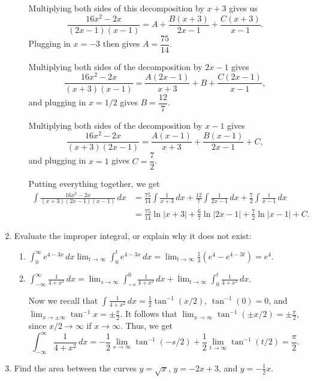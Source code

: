\documentclass[12pt]{article}
\newcommand{\di}{\displaystyle}
\newcommand{\abs}[1]{\lvert #1\rvert}
\begin{document}
\begin{enumerate}
\begin{enumerate}
Multiplying both sides of this decomposition by $x+3$ gives us 
\[
 \dfrac{16x^2-2x}{(2x-1)(x-1)} = A +\dfrac{B(x+3)}{2x-1}+\dfrac{C(x+3)}{x-1}.
\]
 Plugging in $x=-3$ then gives
$A=\dfrac{75}{14}$.

Multiplying both sides of the decomposition by $2x-1$ gives 
\[
 \dfrac{16x^2-2x}{(x+3)(x-1)} = \dfrac{A(2x-1)}{x+3}+B+\dfrac{C(2x-1)}{x-1},
\]
 and plugging in $x=1/2$ gives $B = \dfrac{12}{7}$.

Multiplying both sides of the decomposition by $x-1$ gives 
\[
 \dfrac{16x^2-2x}{(x+3)(2x-1)} = \dfrac{A(x-1)}{x+3}+\dfrac{B(x-1)}{2x-1}+C,
\]
 and plugging in $x=1$ gives $C=\dfrac{7}{2}$.

Putting everything together, we get
\begin{align*}
 \int \frac{16x^2-2x}{(x+3)(2x-1)(x-1)}\,dx &= \frac{75}{14}\int\frac{1}{x+3}\,dx +\frac{12}{7}\int\frac{1}{2x-1}\,dx + \frac{7}{2}\int\frac{1}{x-1}\,dx\\
& = \frac{75}{14}\ln\abs{x+3}+\frac{6}{7}\ln\abs{2x-1}+\frac{7}{2}\ln\abs{x-1}+C.
\end{align*}

\end{enumerate}



  \item Evaluate the improper integral, or explain why it does not exist:
\begin{enumerate}
 \item $\di \int_0^\infty e^{4-3x}\,dx\lim_{t\to \infty}\int_0^t e^{4-3x}\,dx = \lim_{t\to\infty}\frac{1}{3}(e^4-e^{4-3t})=e^4.$
 

 
 \item $\di \int_{-\infty}^\infty \frac{1}{4+x^2}\,dx = \lim_{s\to\infty}\int_{-s}^0\frac{1}{4+x^2}\,dx+\lim_{t\to\infty}\int_0^t\frac{1}{4+x^2}\,dx$.

Now we recall that $\di \int \frac{1}{4+x^2}\,dx = \frac{1}{2}\tan^{-1}(x/2)$, $\tan^{-1}(0)=0$, and $\lim_{x\to\pm\infty}\tan^{-1}x = \pm \frac{\pi}{2}$. It follows that $\lim_{x\to\infty}\tan^{-1}(\pm x/2) = \pm \frac{\pi}{2}$, since $x/2\to \infty$ if $x\to \infty$. Thus, we get
\[
 \int_{-\infty}^\infty \frac{1}{4+x^2}\,dx = -\frac{1}{2}\lim_{s\to \infty}\tan^{-1}(-s/2)+\frac{1}{2}\lim_{t\to\infty}\tan^{-1}(t/2) = \frac{\pi}{2}.
\]
\end{enumerate}

\newpage

 \item Find the area between the  curves
$y=\sqrt{x}$, $y=-2x+3$, and $y=-\frac{1}{2}x$.



\end{enumerate}
\end{document}

